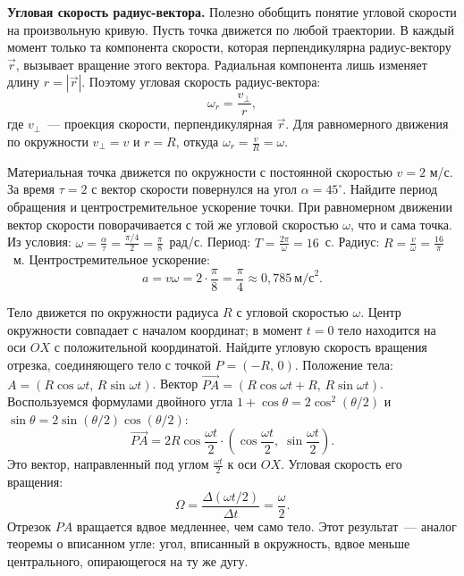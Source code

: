 \documentclass[../main.tex]{subfiles}
\begin{document}
\noindent\textbf{Угловая скорость радиус-вектора.}
Полезно обобщить понятие угловой скорости на произвольную кривую.
Пусть точка движется по любой траектории. В каждый момент только
та компонента скорости, которая перпендикулярна радиус-вектору $\vec{r}$,
вызывает вращение этого вектора. Радиальная компонента лишь изменяет
длину $r = |\vec{r}|$. Поэтому угловая скорость радиус-вектора:
\[
\omega_r = \frac{v_\perp}{r},
\]
где $v_\perp$~--- проекция скорости, перпендикулярная $\vec{r}$.
Для равномерного движения по окружности $v_\perp = v$ и $r = R$,
откуда $\omega_r = \frac{v}{R} = \omega$.

\begin{example}
Материальная точка движется по окружности с постоянной скоростью
$v = 2$ м/с. За время $\tau = 2$ с вектор скорости повернулся на угол
$\alpha = 45^\circ$. Найдите период обращения и центростремительное
ускорение точки.
При равномерном движении вектор скорости поворачивается с той же угловой
скоростью $\omega$, что и сама точка. Из условия:
$\omega = \frac{\alpha}{\tau} = \frac{\pi/4}{2} = \frac{\pi}{8}$~рад/с.
Период: $T = \frac{2\pi}{\omega} = 16$~с.
Радиус: $R = \frac{v}{\omega} = \frac{16}{\pi}$~м.
Центростремительное ускорение:
\[
a = v\omega = 2 \cdot \frac{\pi}{8} = \frac{\pi}{4} \approx 0{,}785~\text{м/с}^2.
\]
\end{example}

\begin{example}
Тело движется по окружности радиуса $R$ с угловой скоростью $\omega$.
Центр окружности совпадает с началом координат; в момент $t = 0$
тело находится на оси $OX$ с положительной координатой.
Найдите угловую скорость вращения отрезка, соединяющего тело
с точкой $P = (-R,\, 0)$.
Положение тела: $A = (R\cos\omega t,\, R\sin\omega t)$.
Вектор $\overrightarrow{PA} = (R\cos\omega t + R,\, R\sin\omega t)$.
Воспользуемся формулами двойного угла
$1 + \cos\theta = 2\cos^2(\theta/2)$ и $\sin\theta = 2\sin(\theta/2)\cos(\theta/2)$:
\[
\overrightarrow{PA} = 2R\cos\frac{\omega t}{2}
\cdot \left(\cos\frac{\omega t}{2},\; \sin\frac{\omega t}{2}\right).
\]
Это вектор, направленный под углом $\frac{\omega t}{2}$ к оси $OX$.
Угловая скорость его вращения:
\[
\Omega = \frac{\Delta(\omega t/2)}{\Delta t} = \frac{\omega}{2}.
\]
Отрезок $PA$ вращается вдвое медленнее, чем само тело.
Этот результат~--- аналог теоремы о вписанном угле: угол, вписанный
в окружность, вдвое меньше центрального, опирающегося на ту же дугу.
\end{example}

\end{document}
